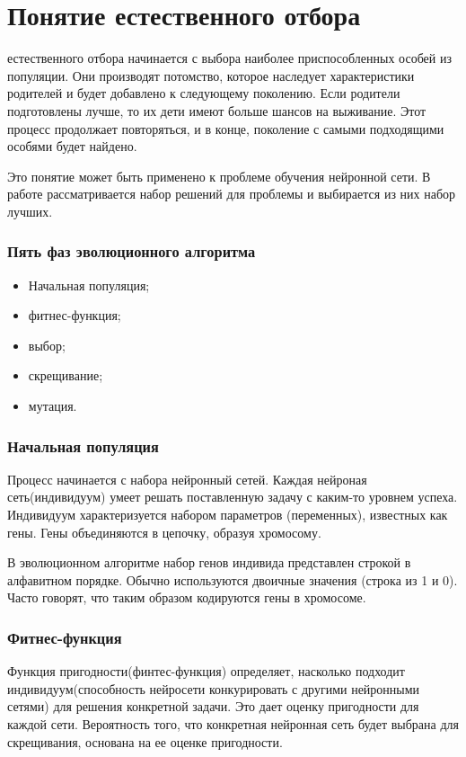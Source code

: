 \section{Понятие естественного отбора}

\indent {} естественного отбора начинается с выбора наиболее приспособленных особей из популяции. Они производят потомство, которое наследует характеристики родителей и будет добавлено к следующему поколению. Если родители подготовлены лучше, то их дети имеют больше шансов на выживание. Этот процесс продолжает повторяться, и в конце, поколение с самыми подходящими особями будет найдено.

Это понятие может быть применено к проблеме обучения нейронной сети. В работе рассматривается набор решений для проблемы и выбирается из них набор лучших.

\subsubsection{Пять фаз эволюционного алгоритма}
\begin{itemize}
  \item Начальная популяция;
  \item фитнес-функция;
  \item выбор;
  \item скрещивание;
  \item мутация.
\end{itemize}

\subsubsection{Начальная популяция}
\indent \indent Процесс начинается с набора нейронный сетей. Каждая нейроная сеть(индивидуум) умеет решать поставленную задачу с каким-то уровнем успеха.
Индивидуум характеризуется набором параметров (переменных), известных как гены. Гены объединяются в цепочку, образуя хромосому.

В эволюционном алгоритме набор генов индивида представлен строкой в алфавитном порядке. Обычно используются двоичные значения (строка из 1 и 0). Часто говорят, что таким образом кодируются гены в хромосоме.

\subsubsection{Фитнес-функция}
\indent \indent Функция пригодности(финтес-функция) определяет, насколько подходит индивидуум(способность нейросети конкурировать с другими нейронными сетями) для решения конкретной задачи. Это дает оценку пригодности для каждой сети. Вероятность того, что конкретная нейронная сеть будет выбрана для скрещивания, основана на ее оценке пригодности.

